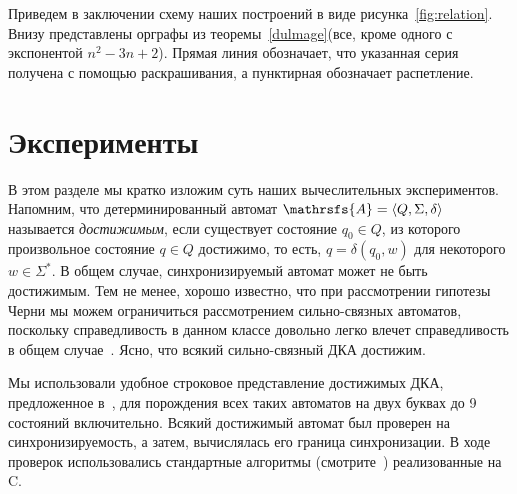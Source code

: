 \documentclass[11pt]{article}
\newcommand{\san}{synchronizing automaton}
\begin{document}
Приведем в заключении схему наших построений в виде рисунка~\ref{fig:relation}. Внизу представлены орграфы из теоремы~\ref{dulmage}(все,
кроме одного с экспонентой $n^2 - 3n + 2$). Прямая линия обозначает, что указанная серия получена с 
помощью раскрашивания, а пунктирная обозначает распетление.


\section{Эксперименты}
\label{experiments}
В этом разделе мы кратко изложим суть наших вычеслительных экспериментов.
Напомним, что детерминированный автомат $\mathrsfs{A}=\langle Q,\Sigma,\delta\rangle$ называется
\emph{достижимым}, если существует состояние $q_0\in Q$, из которого произвольное состояние 
$q\in Q$ достижимо, то есть, $q=\delta(q_0,w)$ для некоторого $w\in\Sigma^*$. В общем случае,
синхронизируемый автомат может не быть достижимым. Тем не менее, хорошо известно,
что при рассмотрении гипотезы Черни мы можем ограничиться рассмотрением сильно-связных автоматов,
поскольку справедливость в данном классе довольно легко влечет справедливость в общем
случае~\cite{Pi78}. Ясно, что всякий сильно-связный ДКА достижим.



Мы использовали удобное строковое представление достижимых ДКА, предложенное
в~\cite{AMR}, для порождения всех таких автоматов на двух буквах до 9 состояний
включительно. Всякий достижимый автомат был проверен на синхронизируемость, а
затем, вычислялась его граница синхронизации. В ходе проверок использовались
стандартные алгоритмы (смотрите~\cite{Sa05,Vo08}) реализованные на C.

\end{document}
